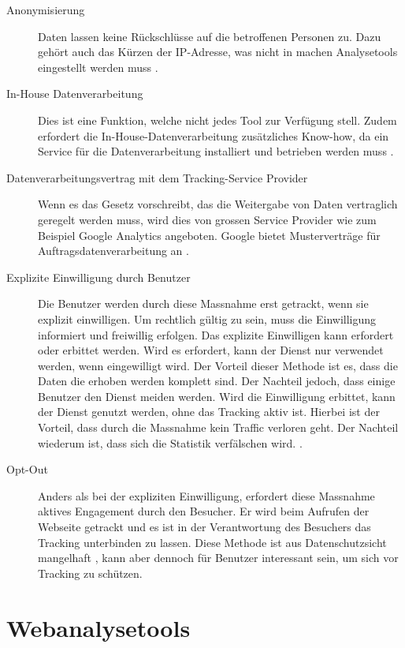 \begin{description}
  \item[Anonymisierung] Daten lassen keine Rückschlüsse auf die betroffenen Personen zu. Dazu gehört auch das Kürzen der IP-Adresse, was nicht in machen Analysetools eingestellt werden muss \parencite[S. 3]{EcommerceUndDatenschutz}.
  \item[In-House Datenverarbeitung] Dies ist eine Funktion, welche nicht jedes Tool zur Verfügung stell. Zudem erfordert die In-House-Datenverarbeitung zusätzliches Know-how, da ein Service für die Datenverarbeitung installiert und betrieben werden muss \parencite[S. 175]{nakatani2011toolselectionmethod}. 
  \item[Datenverarbeitungsvertrag mit dem Tracking-Service Provider] Wenn es das Gesetz vorschreibt, das die Weitergabe von Daten vertraglich geregelt werden muss, wird dies von grossen Service Provider wie zum Beispiel Google Analytics angeboten. Google bietet Musterverträge für Auftragsdatenverarbeitung an \parencite[S. 5]{EcommerceUndDatenschutz}. 
  \item[Explizite Einwilligung durch Benutzer] Die Benutzer werden durch diese Massnahme erst getrackt, wenn sie explizit einwilligen. Um rechtlich gültig zu sein, muss die Einwilligung informiert und freiwillig erfolgen. Das explizite Einwilligen kann erfordert oder erbittet werden. Wird es erfordert, kann der Dienst nur verwendet werden, wenn eingewilligt wird. Der Vorteil dieser Methode ist es, dass die Daten die erhoben werden komplett sind. Der Nachteil jedoch, dass einige Benutzer den Dienst meiden werden. Wird die Einwilligung erbittet, kann der Dienst genutzt werden, ohne das Tracking aktiv ist. Hierbei ist der Vorteil, dass durch die Massnahme kein Traffic verloren geht. Der Nachteil wiederum ist, dass sich die Statistik verfälschen wird. \parencite[S. 2-3]{EcommerceUndDatenschutz}.
  \item[Opt-Out] Anders als bei der expliziten Einwilligung, erfordert diese Massnahme aktives Engagement durch den Besucher. Er wird beim Aufrufen der Webseite getrackt und es ist in der Verantwortung des Besuchers das Tracking unterbinden zu lassen. Diese Methode ist aus Datenschutzsicht mangelhaft \parencite[§§ 9 Abs. 4]{DSSGBERN}, kann aber dennoch für Benutzer interessant sein, um sich vor Tracking zu schützen.
\end{description}

\newpage

\section{Webanalysetools}

